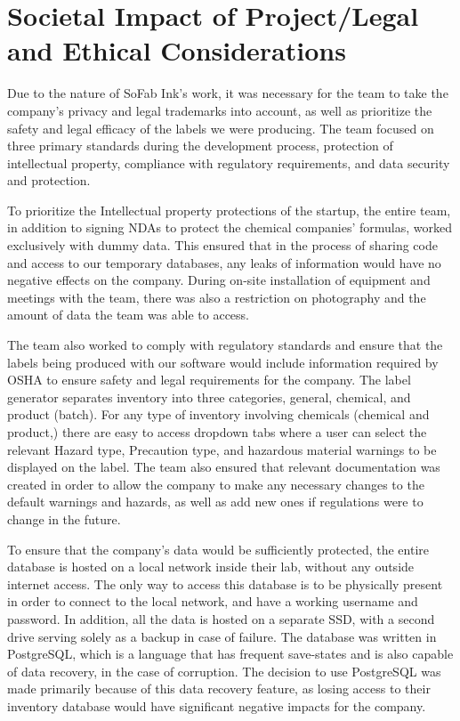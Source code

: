 \documentclass{article}
\begin{document}
\section{Societal Impact of Project\slash Legal and Ethical Considerations} 
Due to the nature of SoFab Ink’s work, it was necessary for the team to take the company’s privacy and legal trademarks into account, as 
well as prioritize the safety and legal efficacy of the labels we were producing. The team focused on three primary standards during 
the development process, protection of intellectual property, compliance with regulatory requirements, and data security 
and protection. 

To prioritize the Intellectual property protections of the startup, the entire team, in addition to signing NDAs to protect the 
chemical companies' formulas, worked exclusively with dummy data. This ensured that in the process of sharing code and access to our 
temporary databases, any leaks of information would have no negative effects on the company. During on-site installation of equipment 
and meetings with the team, there was also a restriction on photography and the amount of data the team was able to access.  

The team also worked to comply with regulatory standards and ensure that the labels being produced with our software would 
include information required by OSHA to ensure safety and legal requirements for the company. The label generator separates 
inventory into three categories, general, chemical, and product (batch). For any type of inventory involving chemicals (chemical 
and product,) there are easy to access dropdown tabs where a user can select the relevant Hazard type, Precaution type, and hazardous 
material warnings to be displayed on the label. The team also ensured that relevant documentation was created in order to allow the 
company to make any necessary changes to the default warnings and hazards, as well as add new ones if regulations were to change in 
the future. 

To ensure that the company’s data would be sufficiently protected, the entire database is hosted on a local network inside their 
lab, without any outside internet access. The only way to access this database is to be physically present in order to connect to 
the local network, and have a working username and password.  In addition, all the data is hosted on a separate SSD, with a second 
drive serving solely as a backup in case of failure. The database was written in PostgreSQL, which is a language that has frequent 
save-states and is also capable of data recovery, in the case of corruption. The decision to use PostgreSQL was made primarily 
because of this data recovery feature, as losing access to their inventory database would have significant negative impacts for the 
company. 
\end{document}

